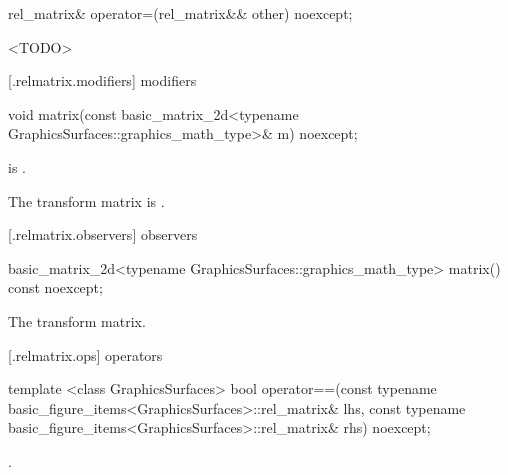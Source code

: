 %
\begin{itemdecl}
rel_matrix& operator=(rel_matrix&& other) noexcept;
\end{itemdecl}
\begin{itemdescr}
\pnum
\effects
<TODO>

\pnum
\returns
{}
\end{itemdescr}

 [\iotwod.relmatrix.modifiers]{ modifiers}

%
\begin{itemdecl}
void matrix(const basic_matrix_2d<typename GraphicsSurfaces::graphics_math_type>& m) noexcept;
\end{itemdecl}
\begin{itemdescr}
\pnum
\requires
{} is .

\pnum
\effects
The transform matrix is .
\end{itemdescr}

 [\iotwod.relmatrix.observers]{ observers}

%
\begin{itemdecl}
basic_matrix_2d<typename GraphicsSurfaces::graphics_math_type> matrix() const noexcept;
\end{itemdecl}
\begin{itemdescr}
\pnum
\returns
The transform matrix.
\end{itemdescr}

 [\iotwod.relmatrix.ops]{ operators}

%
\begin{itemdecl}
template <class GraphicsSurfaces>
bool operator==(const typename basic_figure_items<GraphicsSurfaces>::rel_matrix& lhs,
  const typename basic_figure_items<GraphicsSurfaces>::rel_matrix& rhs) noexcept;
\end{itemdecl}
\begin{itemdescr}
\pnum
\returns
{}.
\end{itemdescr}
